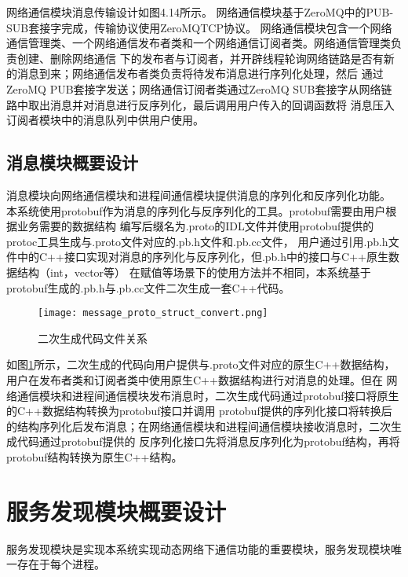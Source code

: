 网络通信模块消息传输设计如图4.14所示。
网络通信模块基于ZeroMQ中的PUB-SUB套接字完成，传输协议使用ZeroMQTCP协议。
网络通信模块包含一个网络通信管理类、一个网络通信发布者类和一个网络通信订阅者类。网络通信管理类负责创建、删除网络通信
下的发布者与订阅者，并开辟线程轮询网络链路是否有新的消息到来；网络通信发布者类负责将待发布消息进行序列化处理，然后
通过ZeroMQ PUB套接字发送；网络通信订阅者类通过ZeroMQ SUB套接字从网络链路中取出消息并对消息进行反序列化，最后调用用户传入的回调函数将
消息压入订阅者模块中的消息队列中供用户使用。

\subsection{消息模块概要设计}
消息模块向网络通信模块和进程间通信模块提供消息的序列化和反序列化功能。
本系统使用protobuf作为消息的序列化与反序列化的工具。protobuf需要由用户根据业务需要的数据结构
编写后缀名为.proto的IDL文件并使用protobuf提供的protoc工具生成与.proto文件对应的.pb.h文件和.pb.cc文件，
用户通过引用.pb.h文件中的C++接口实现对消息的序列化与反序列化，但.pb.h中的接口与C++原生数据结构（int，vector等）
在赋值等场景下的使用方法并不相同，本系统基于protobuf生成的.pb.h与.pb.cc文件二次生成一套C++代码。
\begin{figure}[H]
  \centering
  \texttt{[image: message\_proto\_struct\_convert.png]}
  \caption{二次生成代码文件关系}
  \label{proto-struct-convert}
\end{figure}

如图\ref{proto-struct-convert}所示，二次生成的代码向用户提供与.proto文件对应的原生C++数据结构，用户在发布者类和订阅者类中使用原生C++数据结构进行对消息的处理。但在
网络通信模块和进程间通信模块发布消息时，二次生成代码通过protobuf接口将原生的C++数据结构转换为protobuf接口并调用
protobuf提供的序列化接口将转换后的结构序列化后发布消息；在网络通信模块和进程间通信模块接收消息时，二次生成代码通过protobuf提供的
反序列化接口先将消息反序列化为protobuf结构，再将protobuf结构转换为原生C++结构。



\section{服务发现模块概要设计}
服务发现模块是实现本系统实现动态网络下通信功能的重要模块，服务发现模块唯一存在于每个进程。


